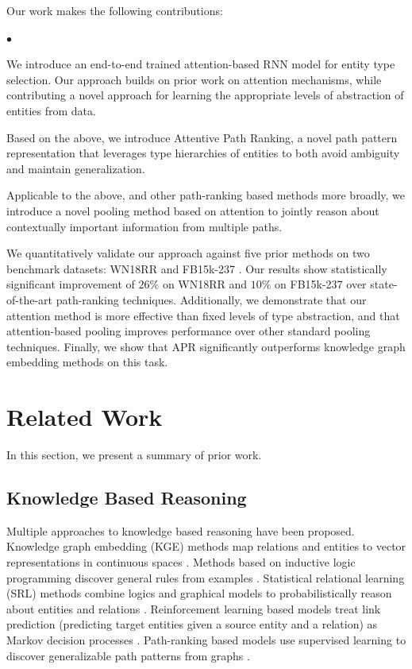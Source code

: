 \documentclass[letterpaper]{article} %
\newenvironment{flushitemize}{%
\begin{list}{$\bullet$}
   {\setlength{\leftmargin}{15pt}}%
    \setlength{\labelwidth}{20pt}
    \setlength{\itemindent}{0pt}
    \setlength{\labelsep}{0.5em}
 \setlength{\itemsep}{1pt}
 \setlength{\parskip}{0pt} 
 \setlength{\parsep}{0pt}}
 {\end{list}}
\begin{document}
Our work makes the following contributions:  
\begin{flushitemize}
    \item We introduce an end-to-end trained attention-based RNN model for entity type selection. Our approach builds on prior work on attention mechanisms, while contributing a novel approach for learning the appropriate levels of abstraction of entities from data. 
    \item Based on the above, we introduce Attentive Path Ranking, a novel path pattern representation that leverages type hierarchies of entities to both avoid ambiguity and maintain generalization. 
    \item Applicable to the above, and other path-ranking based methods more broadly, we introduce a novel pooling method based on attention to jointly reason about contextually important information from multiple paths.
\end{flushitemize}
We quantitatively validate our approach against five prior methods on two benchmark datasets: WN18RR \cite{wn18rr} and FB15k-237 \cite{fb15k-237}.  Our results show statistically significant improvement of $26\%$ on WN18RR and $10\%$ on FB15k-237 over state-of-the-art path-ranking techniques.  Additionally, we demonstrate that our attention method is more effective than fixed levels of type abstraction, and that attention-based pooling improves performance over other standard pooling techniques.  Finally, we show that APR significantly outperforms knowledge graph embedding methods on this task.

\section{Related Work}

In this section, we present a summary of prior work. 

\subsection{Knowledge Based Reasoning}
Multiple approaches to knowledge based reasoning have been proposed. Knowledge graph embedding (KGE) methods map relations and entities to vector representations in continuous spaces \cite{nickel}. Methods based on inductive logic programming discover general rules from examples \cite{quinlan1993foil}. Statistical relational learning (SRL) methods combine logics and graphical models to probabilistically reason about entities and relations \cite{getoor2007srl}. Reinforcement learning based models treat link prediction (predicting target entities given a source entity and a relation) as Markov decision processes \cite{deeppath,das2017go}. Path-ranking based models use supervised learning to discover generalizable path patterns from graphs \cite{pra,sfe,cvsm,chains}.
\end{document}
